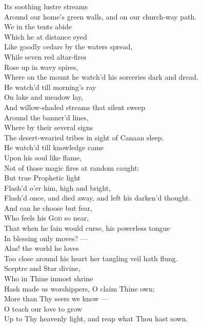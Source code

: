  Its soothing lustre streams \\
 Around our home’s green walls, and on our church-way path. \\
  We in the tents abide \\
 Which he at distance eyed \\
 Like goodly cedars by the waters spread, \\
 While seven red altar-fires \\
 Rose up in wavy spires, \\
 Where on the mount he watch’d his sorceries dark and dread. \\
  He watch’d till morning’s ray \\
 On lake and meadow lay, \\
 And willow-shaded streams that silent sweep \\
 Around the banner’d lines, \\
 Where by their several signs \\
 The desert-wearied tribes in sight of Canaan sleep. \\
  He watch’d till knowledge came \\
 Upon his soul like flame, \\
 Not of those magic fires at random caught: \\
 But true Prophetic light \\
 Flash’d o’er him, high and bright, \\
 Flash’d once, and died away, and left his darken’d thought. \\
  And can he choose but fear, \\
 Who feels his \textsc{God} so near, \\
 That when he fain would curse, his powerless tongue \\
 In blessing only moves? — \\
 Alas! the world he loves \\
 Too close around his heart her tangling veil hath flung. \\
  Sceptre and Star divine, \\
 Who in Thine inmost shrine \\
 Hash made us worshippers, O claim Thine own; \\
 More than Thy seers we know — \\
 O teach our love to grow \\
 Up to Thy heavenly light, and reap what Thou hast sown.\\



